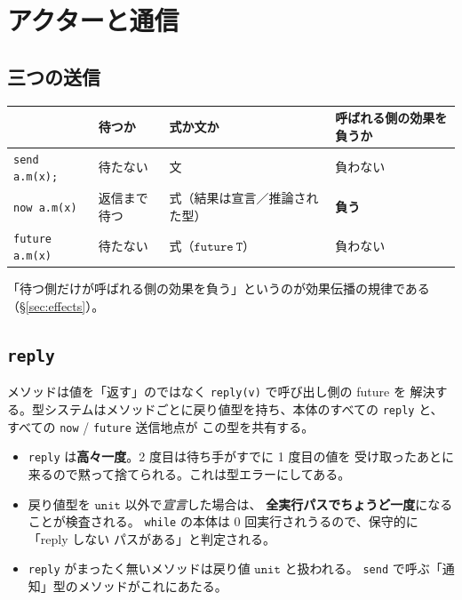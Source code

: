 \documentclass[11pt,a4paper]{ltjsarticle}
\newcommand{\ty}[1]{\ensuremath{\mathtt{#1}}}
\begin{document}
\section{アクターと通信}

\subsection{三つの送信}

\begin{center}
\begin{tabular}{@{}llll@{}}
\toprule
 & 待つか & 式か文か & 呼ばれる側の効果を負うか \\
\midrule
\texttt{send a.m(x);}      & 待たない     & 文 & 負わない \\
\texttt{now a.m(x)}        & 返信まで待つ & 式（結果は宣言／推論された型） & \textbf{負う} \\
\texttt{future a.m(x)}     & 待たない     & 式（\ty{future\ T}） & 負わない \\
\bottomrule
\end{tabular}
\end{center}

「待つ側だけが呼ばれる側の効果を負う」というのが効果伝播の規律である
（\S\ref{sec:effects}）。

\subsection{\texttt{reply}}

メソッドは値を「返す」のではなく \texttt{reply(v)} で呼び出し側の future を
解決する。型システムはメソッドごとに戻り値型を持ち、本体のすべての
\texttt{reply} と、すべての \texttt{now} / \texttt{future} 送信地点が
この型を共有する。

\begin{itemize}
\item \texttt{reply} は\textbf{高々一度}。2 度目は待ち手がすでに 1 度目の値を
  受け取ったあとに来るので黙って捨てられる。これは型エラーにしてある。
\item 戻り値型を \ty{unit} 以外で\emph{宣言}した場合は、
  \textbf{全実行パスでちょうど一度}になることが検査される。
  \texttt{while} の本体は 0 回実行されうるので、保守的に「reply しない
  パスがある」と判定される。
\item \texttt{reply} がまったく無いメソッドは戻り値 \ty{unit} と扱われる。
  \texttt{send} で呼ぶ「通知」型のメソッドがこれにあたる。
\end{itemize}
\end{document}
